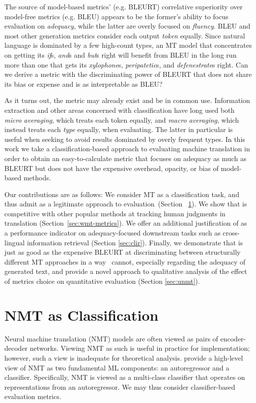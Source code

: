 The source of model-based metrics' (e.g. BLEURT) correlative superiority over model-free metrics (e.g. BLEU) appears to be the former's ability to focus evaluation on \textit{adequacy}, while the latter are overly focused on \textit{fluency}. BLEU and most other generation metrics consider each output \textit{token} equally. Since natural language is dominated by a few high-count types, an MT model that concentrates on getting its \textit{if}s, \textit{and}s and \textit{but}s right will benefit from BLEU in the long run more than one that gets its \textit{xylophone}s, \textit{peripatetic}s, and \textit{defenestrate}s right. Can we derive a metric with the discriminating power of BLEURT that does not share its bias or expense and is as interpretable as BLEU? 

As it turns out, the metric may already exist and be in common use. Information extraction and other areas concerned with classification have long used both \textit{micro averaging}, which treats each token equally, and \textit{macro averaging}, which instead treats each \textit{type} equally, when evaluating. The latter in particular is useful when seeking to avoid results dominated by overly frequent types.  In this work we take a classification-based approach to evaluating machine translation in order to obtain an easy-to-calculate metric that focuses on adequacy as much as BLEURT but does not have the expensive overhead, opacity, or bias of model-based methods. 


Our contributions are as follows:
We consider MT as a classification task, and thus admit  as a legitimate approach to evaluation~(Section ~\ref{sec:mt-as-cls}). 
We show that  is competitive with other popular methods at tracking human judgments in translation (Section~\ref{sec:wmt-metrics}). 
We offer an additional justification of  as a performance indicator on adequacy-focused downstream tasks such as cross-lingual information retrieval (Section \ref{sec:clir}). 
Finally, we demonstrate that  is just as good as the expensive BLEURT at discriminating between structurally different MT approaches in a way \bleu\ cannot, especially regarding the adequacy of generated text, and provide a novel approach to qualitative analysis of the effect of metrics choice on quantitative evaluation (Section \ref{sec:unmt}).




\section{NMT as Classification}
\label{sec:mt-as-cls}
Neural machine translation (NMT) models are often viewed as pairs of encoder-decoder networks.
Viewing NMT as such is useful in practice for implementation; however, such a view is inadequate for theoretical analysis. 
\citet{gowda-may-2020-finding} provide a high-level view of NMT as two fundamental ML components: an autoregressor and a classifier. 
Specifically, NMT is viewed as a multi-class classifier that operates on representations from an autoregressor.
We may thus consider classifier-based evaluation metrics.


